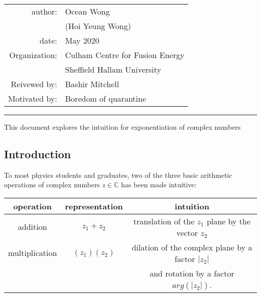\documentclass[a4paper, 12pt]{article}
\begin{document}
\centering
    
\begin{table}[!h]
\centering
\begin{tabular}{rl}
author:&Ocean Wong          \\
       &(Hoi Yeung Wong)    \\
date:  &May 2020       \\
Organization:&Culham Centre for Fusion Energy\\
            & Sheffield Hallam University\\
Reivewed by:&Bashir Mitchell\\
Motivated by:&Boredom of quarantine
\end{tabular}
\end{table}
\hrule
\abstract
This document explores the intuition for exponentiation of complex numbers

\begin{center}
\chapter{}
\end{center}
\section{Introduction}
To most physics students and graduates, two of the three basic arithmetic operations of complex numbers $z \in \mathbb{C}$ has been made intuitive:
\begin{longtable}{ccc}
\hline
operation& representation & intuition\\
\hline
addition & $z_1+z_2$ & translation of the $z_1$ plane by the vector $z_2$\\
multiplication & $(z_1)(z_2)$ & dilation of the complex plane by a factor $|z_2|$\\ && and rotation by a factor $arg(|z_2|)$. \\
\hline
\end{longtable}
\end{document}
